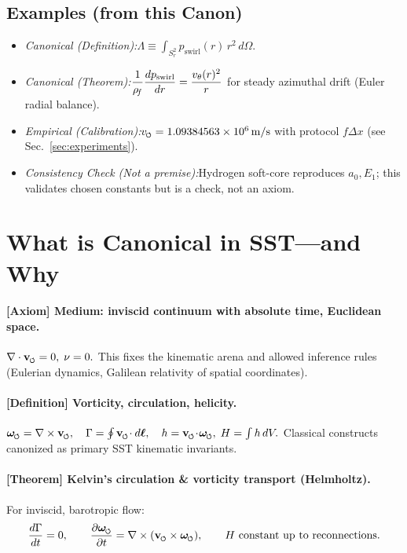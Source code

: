 \documentclass[11pt]{article}
\begin{document}
\subsection*{Examples (from this Canon)}
\begin{itemize}
\item \textit{Canonical (Definition):}\quad $\displaystyle \Lambda \equiv \int_{S_r^2} p_{\text{swirl}}(r)\,r^2\,d\Omega.$
\item \textit{Canonical (Theorem):}\quad $\displaystyle \frac{1}{\rho_{\!f}}\frac{dp_{\text{swirl}}}{dr}=\frac{v_\theta(r)^2}{r}$ for steady azimuthal drift (Euler radial balance).
\item \textit{Empirical (Calibration):}\quad $\vscore = 1.09384563\times10^{6}\,\mathrm{m/s}$ with protocol $f\Delta x$ (see Sec.~\ref{sec:experiments}).
\item \textit{Consistency Check (Not a premise):}\quad Hydrogen soft-core reproduces $a_0, E_1$; this validates chosen constants but is a check, not an axiom.
\end{itemize}

\section{What is Canonical in SST—and Why}
\label{sec:canonical_overview}
\paragraph{[Axiom] Medium: inviscid continuum with absolute time, Euclidean space.}
    $\nabla\cdot\vswirl=0,\;\nu=0.$
    This fixes the kinematic arena and allowed inference rules (Eulerian dynamics, Galilean relativity of spatial coordinates).

\paragraph{[Definition] Vorticity, circulation, helicity.}
    $\omegas=\nabla\times \vswirl,\quad \Gamma=\oint \vswirl\!\cdot d\boldsymbol{\ell},\quad h=\vswirl\!\cdot\!\omegas,\; H=\int h\,dV.$
    Classical constructs canonized as primary SST kinematic invariants.

\paragraph{[Theorem] Kelvin’s circulation \& vorticity transport (Helmholtz).}
    For inviscid, barotropic flow:
    \[
        \frac{d\Gamma}{dt}=0,\qquad
        \pdv{\omegas}{t}=\nabla\times(\vswirl\times\omegas),\qquad
        \text{$H$ constant up to reconnections}.
    \]
\end{document}

